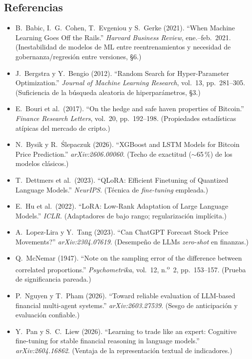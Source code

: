\documentclass[11pt]{article}
\begin{document}
\subsection*{\sffamily Referencias}
{\footnotesize
\begin{itemize}[leftmargin=1.4em]
\item B.~Babic, I.~G.~Cohen, T.~Evgeniou y S.~Gerke (2021). ``When Machine Learning Goes Off the Rails.'' \textit{Harvard Business Review}, ene.--feb.~2021. (Inestabilidad de modelos de ML entre reentrenamientos y necesidad de gobernanza/regresi\'on entre versiones, \S6.)
\item J.~Bergstra y Y.~Bengio (2012). ``Random Search for Hyper-Parameter Optimization.'' \textit{Journal of Machine Learning Research}, vol.~13, pp.~281--305. (Suficiencia de la b\'usqueda aleatoria de hiperpar\'ametros, \S3.)
\item E.~Bouri et al.\ (2017). ``On the hedge and safe haven properties of Bitcoin.'' \textit{Finance Research Letters}, vol.~20, pp.~192--198. (Propiedades estad\'isticas at\'ipicas del mercado de cripto.)
\item N.~Bysik y R.~\'Slepaczuk (2026). ``XGBoost and LSTM Models for Bitcoin Price Prediction.'' \textit{arXiv:2606.00060}. (Techo de exactitud ($\sim$65\,\%) de los modelos cl\'asicos.)
\item T.~Dettmers et al.\ (2023). ``QLoRA: Efficient Finetuning of Quantized Language Models.'' \textit{NeurIPS}. (T\'ecnica de \textit{fine-tuning} empleada.)
\item E.~Hu et al.\ (2022). ``LoRA: Low-Rank Adaptation of Large Language Models.'' \textit{ICLR}. (Adaptadores de bajo rango; regularizaci\'on impl\'icita.)
\item A.~Lopez-Lira y Y.~Tang (2023). ``Can ChatGPT Forecast Stock Price Movements?'' \textit{arXiv:2304.07619}. (Desempe\~no de LLMs \textit{zero-shot} en finanzas.)
\item Q.~McNemar (1947). ``Note on the sampling error of the difference between correlated proportions.'' \textit{Psychometrika}, vol.~12, n.\textsuperscript{o}~2, pp.~153--157. (Prueba de significancia pareada.)
\item P.~Nguyen y T.~Pham (2026). ``Toward reliable evaluation of LLM-based financial multi-agent systems.'' \textit{arXiv:2603.27539}. (Sesgo de anticipaci\'on y evaluaci\'on confiable.)
\item Y.~Pan y S.~C.~Liew (2026). ``Learning to trade like an expert: Cognitive fine-tuning for stable financial reasoning in language models.'' \textit{arXiv:2604.16862}. (Ventaja de la representaci\'on textual de indicadores.)

\end{itemize}}
\end{document}

